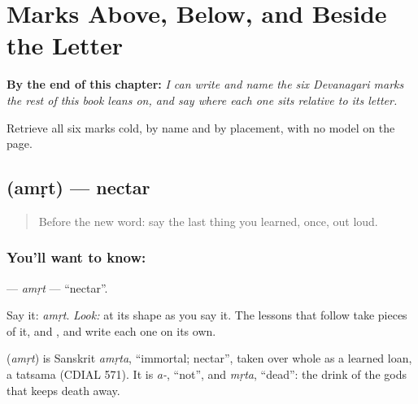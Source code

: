 
\chapter{Marks Above, Below, and Beside the Letter}
\label{ch:marks-runway}

\begin{chapteropening}
\textbf{By the end of this chapter:} \emph{I can write and name the six Devanagari marks the rest of this book leans on, and say where each one sits relative to its letter.}

Retrieve all six marks cold, by name and by placement, with no model on the page.
\end{chapteropening}

\section[\texorpdfstring{\mr{अमृत} (amṛt)}{अमृत (amṛt)}]{ (amṛt) — nectar}

\label{lesson:MR-C05-amrut}



\begin{quote}
Before the new word: say the last thing you learned, once, out loud.
\end{quote}

\subsection*{You'll want to know: }
\textbf{} — \emph{amṛt} — \textquotedblleft{}nectar\textquotedblright{}.

Say it: \emph{amṛt}. \emph{Look:} at its shape as you say it. The lessons that follow take pieces of it, \textbf{} and \textbf{}, and write each one on its own.

\begin{cousinweb}
\textbf{} (\emph{amṛt}) is Sanskrit \emph{amṛta}, \textquotedblleft{}immortal; nectar\textquotedblright{}, taken over whole as a learned loan, a tatsama (CDIAL 571). It is \emph{a-}, \textquotedblleft{}not\textquotedblright{}, and \emph{mṛta}, \textquotedblleft{}dead\textquotedblright{}: the drink of the gods that keeps death away.
\end{cousinweb}

